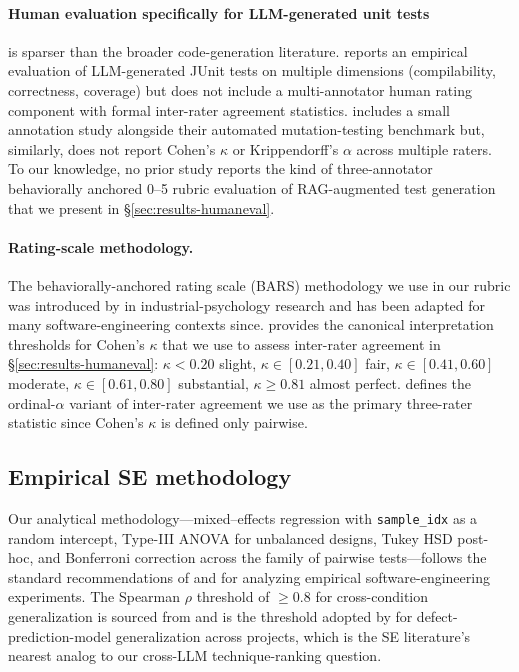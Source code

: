 \documentclass[smallextended]{svjour3}
\begin{document}
 \paragraph{Human evaluation specifically for LLM-generated unit
 tests}
 is sparser than the broader code-generation literature.
 \citet{siddiq2024junit} reports an empirical evaluation of
 LLM-generated JUnit tests on multiple dimensions
 (compilability, correctness, coverage) but does not include a
 multi-annotator human rating component with formal inter-rater
 agreement statistics. \citet{wang2026mutationstudy} includes a small
 annotation study alongside their automated mutation-testing
 benchmark but, similarly, does not report Cohen's $\kappa$ or
 Krippendorff's $\alpha$ across multiple raters. To our knowledge,
 no prior study reports the kind of three-annotator behaviorally
 anchored 0–5 rubric evaluation of RAG-augmented test generation
 that we present in \S\ref{sec:results-humaneval}.
 
 \paragraph{Rating-scale methodology.}
 The behaviorally-anchored rating scale (BARS) methodology we use
 in our rubric was introduced by \citet{smith1963} in
 industrial-psychology research and has been adapted for many
 software-engineering contexts since. \citet{landis1977} provides
 the canonical interpretation thresholds for Cohen's $\kappa$ that
 we use to assess inter-rater agreement in
 \S\ref{sec:results-humaneval}: $\kappa < 0.20$ slight,
 $\kappa \in [0.21, 0.40]$ fair, $\kappa \in [0.41, 0.60]$ moderate,
 $\kappa \in [0.61, 0.80]$ substantial, $\kappa \geq 0.81$ almost
 perfect. \citet{krippendorff2018} defines the ordinal-$\alpha$
 variant of inter-rater agreement we use as the primary three-rater
 statistic since Cohen's $\kappa$ is defined only pairwise.

\subsection{Empirical SE methodology}\label{sec:related-method}

Our analytical methodology—mixed--effects regression with
\texttt{sample\_idx} as a random intercept, Type-III ANOVA for
unbalanced designs, Tukey HSD post-hoc, and Bonferroni correction
across the family of pairwise tests—follows the standard
recommendations of \citet{wohlin2012} and
\citet{madeyski2024empirical} for analyzing empirical
software-engineering experiments. The Spearman $\rho$ threshold of
$\geq 0.8$ for cross-condition generalization is sourced from
\citet{zar1984} and is the threshold adopted by
\citet{jureczko2015} for defect-prediction-model generalization
across projects, which is the SE literature's nearest analog to
our cross-LLM technique-ranking question.
\end{document}
